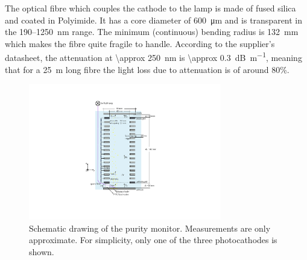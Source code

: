 \documentclass[a4paper,11pt]{article}
\begin{document}
The optical fibre which couples the cathode to the lamp is made of fused silica and coated in Polyimide. It has a core diameter of \SI{600}{\micro m} and is transparent in the 190--\SI{1250}{nm} range. The minimum (continuous) bending radius is \SI{132}{mm} which makes the fibre quite fragile to handle. According to the supplier's datasheet, the attenuation at \SI{\approx 250}{nm} is \SI{\approx 0.3}{dB\per\metre}, meaning that for a \SI{25}{m} long fibre the light loss due to attenuation is of around 80\%. 

\begin{figure}[t]
	\begin{center}
	\includegraphics[width=0.75\textwidth, trim={6cm 3cm 7cm 2cm}, clip=true]{figures/schematic_purity_monitor.pdf}			
	\caption[]{Schematic drawing of the purity monitor. Measurements are only approximate. For simplicity, only one of the three photocathodes is shown.}
	\label{fig:schematic_PM}
	\end{center}	
\end{figure}
\end{document}
